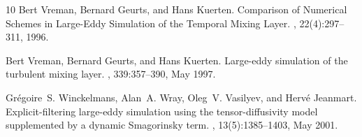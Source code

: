 \documentclass[preprint,twocolumn,5p]{elsarticle}
\begin{document}
\begin{thebibliography}{10}
Bert Vreman, Bernard Geurts, and Hans Kuerten.
\newblock Comparison of {{Numerical Schemes}} in {{Large-Eddy Simulation}} of the {{Temporal Mixing Layer}}.
, 22(4):297--311, 1996.

Bert Vreman, Bernard Geurts, and Hans Kuerten.
\newblock Large-eddy simulation of the turbulent mixing layer.
, 339:357--390, May 1997.

Gr{\'e}goire~S. Winckelmans, Alan~A. Wray, Oleg~V. Vasilyev, and Herv{\'e} Jeanmart.
\newblock Explicit-filtering large-eddy simulation using the tensor-diffusivity model supplemented by a dynamic {{Smagorinsky}} term.
, 13(5):1385--1403, May 2001.

\end{thebibliography}
\end{document}
